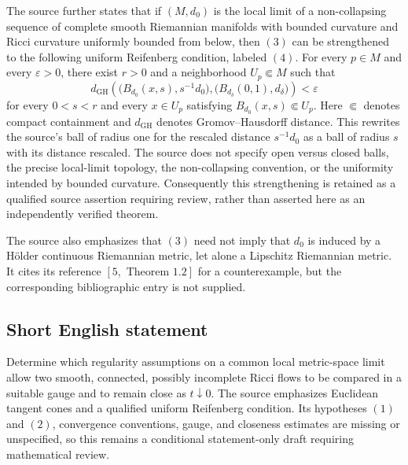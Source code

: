 \documentclass[11pt]{article}
\begin{document}
The source further states that if \((M,d_0)\) is the local limit of a non-collapsing sequence of complete smooth Riemannian manifolds with bounded curvature and Ricci curvature uniformly bounded from below, then \((3)\) can be strengthened to the following uniform Reifenberg condition, labeled \((4)\). For every \(p\in M\) and every \(\varepsilon>0\), there exist \(r>0\) and a neighborhood \(U_p\Subset M\) such that
\[
 d_{\mathrm{GH}}\!\left(
 \bigl(B_{d_0}(x,s),s^{-1}d_0\bigr),
 \bigl(B_{d_\delta}(0,1),d_\delta\bigr)
 \right)<\varepsilon
\]
for every \(0<s<r\) and every \(x\in U_p\) satisfying \(B_{d_0}(x,s)\Subset U_p\). Here \(\Subset\) denotes compact containment and \(d_{\mathrm{GH}}\) denotes Gromov--Hausdorff distance. This rewrites the source's ball of radius one for the rescaled distance \(s^{-1}d_0\) as a ball of radius \(s\) with its distance rescaled. The source does not specify open versus closed balls, the precise local-limit topology, the non-collapsing convention, or the uniformity intended by bounded curvature. Consequently this strengthening is retained as a qualified source assertion requiring review, rather than asserted here as an independently verified theorem.

The source also emphasizes that \((3)\) need not imply that \(d_0\) is induced by a H\"older continuous Riemannian metric, let alone a Lipschitz Riemannian metric. It cites its reference \([5,\text{ Theorem }1.2]\) for a counterexample, but the corresponding bibliographic entry is not supplied.
\subsection{Short English statement}
Determine which regularity assumptions on a common local metric-space limit allow two smooth, connected, possibly incomplete Ricci flows to be compared in a suitable gauge and to remain close as \(t\downarrow0\). The source emphasizes Euclidean tangent cones and a qualified uniform Reifenberg condition. Its hypotheses \((1)\) and \((2)\), convergence conventions, gauge, and closeness estimates are missing or unspecified, so this remains a conditional statement-only draft requiring mathematical review.
\end{document}
